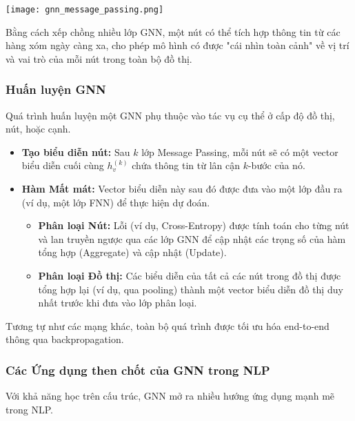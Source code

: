 \begin{center}
    \texttt{[image: gnn\_message\_passing.png]}
    \label{fig:gnn_message_passing}
\end{center}

Bằng cách xếp chồng nhiều lớp GNN, một nút có thể tích hợp thông tin từ các hàng xóm ngày càng xa, cho phép mô hình có được "cái nhìn toàn cảnh" về vị trí và vai trò của mỗi nút trong toàn bộ đồ thị.

\subsubsection{Huấn luyện GNN}
Quá trình huấn luyện một GNN phụ thuộc vào tác vụ cụ thể ở cấp độ đồ thị, nút, hoặc cạnh.
\begin{itemize}
    \item \textbf{Tạo biểu diễn nút:} Sau $k$ lớp Message Passing, mỗi nút sẽ có một vector biểu diễn cuối cùng $h_v^{(k)}$ chứa thông tin từ lân cận $k$-bước của nó.
    \item \textbf{Hàm Mất mát:} Vector biểu diễn này sau đó được đưa vào một lớp đầu ra (ví dụ, một lớp FNN) để thực hiện dự đoán.
        \begin{itemize}
            \item \textbf{Phân loại Nút:} Lỗi (ví dụ, Cross-Entropy) được tính toán cho từng nút và lan truyền ngược qua các lớp GNN để cập nhật các trọng số của hàm tổng hợp (Aggregate) và cập nhật (Update).
            \item \textbf{Phân loại Đồ thị:} Các biểu diễn của tất cả các nút trong đồ thị được tổng hợp lại (ví dụ, qua pooling) thành một vector biểu diễn đồ thị duy nhất trước khi đưa vào lớp phân loại.
        \end{itemize}
\end{itemize}
Tương tự như các mạng khác, toàn bộ quá trình được tối ưu hóa end-to-end thông qua backpropagation.

\subsubsection{Các Ứng dụng then chốt của GNN trong NLP}
\label{ssec:gnn_applications}

Với khả năng học trên cấu trúc, GNN mở ra nhiều hướng ứng dụng mạnh mẽ trong NLP.

